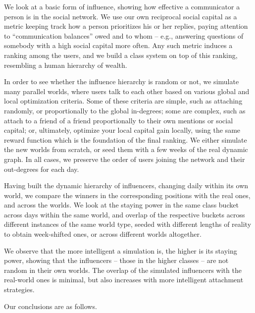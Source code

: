 \documentclass[10pt,oneside]{memoir}
\begin{document}
We look at a basic form of influence, showing how effective a communicator a person is in the social network.  We use our own reciprocal social capital as a metric keeping track how a person prioritizes his or her replies, paying attention to ``communication balances'' owed and to whom -- e.g., answering questions of somebody with a high social capital more often.  Any such metric induces a ranking among the users, and we build a class system on top of this ranking, resembling a human hierarchy of wealth.


In order to see whether the influence hierarchy is random or not, we simulate many parallel worlds, where users talk to each other based on various global and local optimization criteria.  Some of these criteria are simple, such as attaching randomly, or proportionally to the global in-degrees; some are complex, such as attach to a friend of a friend proportionally to their own mentions or social capital; or, ultimately, optimize your local capital gain locally, using the same reward function which is the foundation of the final ranking.  We either simulate the new worlds from scratch, or seed them with a few weeks of the real dynamic graph.  In all cases, we preserve the order of users joining the network and their out-degrees for each day.


Having built the dynamic hierarchy of influencers, changing daily within its own world, we compare the winners in the corresponding positions with the real ones, and across the worlds.  We look at the staying power in the same class bucket across days within the same world, and overlap of the respective buckets across different instances of the same world type, seeded with different lengths of reality to obtain week-shifted ones, or across different worlds altogether.


We observe that the more intelligent a simulation is, the higher is its staying power, showing that the influencers -- those in the higher classes -- are not random in their own worlds.  The overlap of the simulated influencers with the real-world ones is minimal, but also increases with more intelligent attachment strategies.


Our conclusions are as follows.
\end{document}
